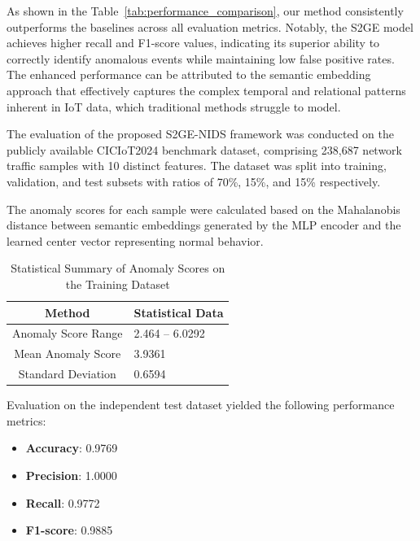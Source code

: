\begin{ZhChapter}
    As shown in the Table~\ref{tab:performance_comparison}, our method consistently outperforms the baselines across all evaluation metrics. Notably, the S2GE model achieves higher recall and F1-score values, indicating its superior ability to correctly identify anomalous events while maintaining low false positive rates. The enhanced performance can be attributed to the semantic embedding approach that effectively captures the complex temporal and relational patterns inherent in IoT data, which traditional methods struggle to model.


    The evaluation of the proposed S2GE-NIDS framework was conducted on the publicly available CICIoT2024 benchmark dataset, comprising 238,687 network traffic samples with 10 distinct features. The dataset was split into training, validation, and test subsets with ratios of 70\%, 15\%, and 15\% respectively.

    The anomaly scores for each sample were calculated based on the Mahalanobis distance between semantic embeddings generated by the MLP encoder and the learned center vector representing normal behavior.

    \begin{table}[!t]
        \centering
        \caption{Statistical Summary of Anomaly Scores on the Training Dataset}
        \vspace{1em}
        \label{tab:StatisticalData}
        \begin{tabular}{|c|p{7cm}|}
            \hline
            \textbf{Method}     & \textbf{Statistical Data} \\
            \hline
            Anomaly Score Range & 2.464 -- 6.0292           \\
            \hline
            Mean Anomaly Score  & 3.9361                    \\
            \hline
            Standard Deviation  & 0.6594                    \\
            \hline
        \end{tabular}
    \end{table}



    Evaluation on the independent test dataset yielded the following performance metrics:

    \begin{itemize}
        \item \textbf{Accuracy}: 0.9769
        \item \textbf{Precision}: 1.0000
        \item \textbf{Recall}: 0.9772
        \item \textbf{F1-score}: 0.9885
    \end{itemize}



\end{ZhChapter}

